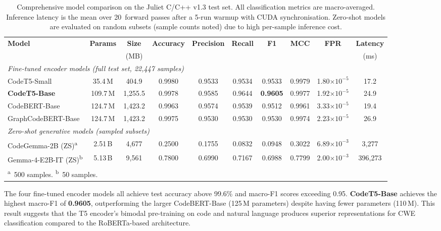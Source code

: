 \begin{table}[t]
\centering
\caption{Comprehensive model comparison on the Juliet C/C++ v1.3 test set.
         All classification metrics are macro-averaged.  Inference latency
         is the mean over 20~forward passes after a 5-run warmup with CUDA
         synchronisation.  Zero-shot models are evaluated on random subsets
         (sample counts noted) due to high per-sample inference cost.}
\label{tab:model_comparison}
\begin{tabular}{lccccccccc}
\hline
\textbf{Model} &
\textbf{Params} &
\textbf{Size} &
\textbf{Accuracy} &
\textbf{Precision} &
\textbf{Recall} &
\textbf{F1} &
\textbf{MCC} &
\textbf{FPR} &
\textbf{Latency} \\
& & (MB) & & & & & & & (ms) \\
\hline
\multicolumn{10}{l}{\textit{Fine-tuned encoder models (full test set, 22,447 samples)}} \\
\hline
CodeT5-Small        & 35.4\,M  & 404.9   & 0.9980 & 0.9533 & 0.9534 & 0.9533 & 0.9979 & 1.80$\times 10^{-5}$ & 17.2 \\
\textbf{CodeT5-Base}& 109.7\,M & 1,255.5 & 0.9978 & 0.9585 & 0.9644 & \textbf{0.9605} & 0.9977 & 1.92$\times 10^{-5}$ & 24.9 \\
CodeBERT-Base       & 124.7\,M & 1,423.2 & 0.9963 & 0.9574 & 0.9539 & 0.9512 & 0.9961 & 3.33$\times 10^{-5}$ & 19.4 \\
GraphCodeBERT-Base  & 124.7\,M & 1,423.2 & 0.9975 & 0.9530 & 0.9530 & 0.9530 & 0.9974 & 2.23$\times 10^{-5}$ & 26.9 \\
\hline
\multicolumn{10}{l}{\textit{Zero-shot generative models (sampled subsets)}} \\
\hline
CodeGemma-2B (ZS)\textsuperscript{a}    & 2.51\,B  & 4,677 & 0.2500 & 0.1755 & 0.0832 & 0.0948 & 0.3022 & 6.89$\times 10^{-3}$ & 3,277 \\
Gemma-4-E2B-IT (ZS)\textsuperscript{b}  & 5.13\,B  & 9,561 & 0.7800 & 0.6990 & 0.7167 & 0.6988 & 0.7799 & 2.00$\times 10^{-3}$ & 396,273 \\
\hline
\multicolumn{10}{l}{\footnotesize\textsuperscript{a}~500 samples. \textsuperscript{b}~50 samples.} \\
\end{tabular}
\end{table}

The four fine-tuned encoder models all achieve test accuracy above 99.6\%
and macro-F1 scores exceeding 0.95.  \textbf{CodeT5-Base} achieves the
highest macro-F1 of \textbf{0.9605}, outperforming the larger
CodeBERT-Base (125\,M parameters) despite having fewer parameters
(110\,M).  This result suggests that the T5 encoder's bimodal pre-training
on code and natural language produces superior representations for CWE
classification compared to the RoBERTa-based architecture.

